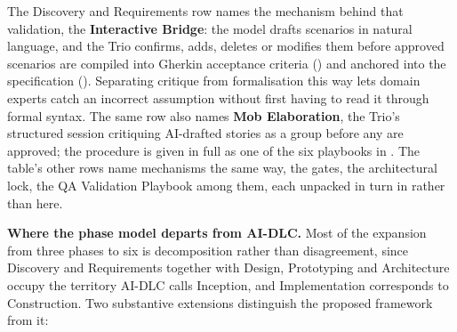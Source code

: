 The Discovery and Requirements row names the mechanism behind that validation, the \textbf{Interactive Bridge}: the model drafts scenarios in natural language, and the Trio confirms, adds, deletes or modifies them before approved scenarios are compiled into Gherkin acceptance criteria () and anchored into the specification (). Separating critique from formalisation this way lets domain experts catch an incorrect assumption without first having to read it through formal syntax. The same row also names \textbf{Mob Elaboration}, the Trio's structured session critiquing AI-drafted stories as a group before any are approved; the procedure is given in full as one of the six playbooks in .  The table's other rows name mechanisms the same way, the gates, the architectural lock, the \ac{QA} Validation Playbook among them, each unpacked in turn in  rather than here.

\textbf{Where the phase model departs from \ac{AI-DLC}.} Most of the expansion from three phases to six is decomposition rather than disagreement, since Discovery and Requirements together with Design, Prototyping and Architecture occupy the territory \ac{AI-DLC} calls Inception, and Implementation corresponds to Construction. Two substantive extensions distinguish the proposed framework from it:

